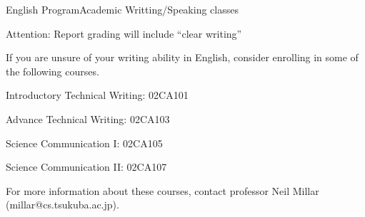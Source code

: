 \documentclass[t]{beamer}
\begin{document}
\begin{ftst}
{English Program}{Academic Writting/Speaking classes}
\begin{block}{}
Attention: Report grading will include ``clear writing''
\end{block}

\vone

If you are unsure of your writing ability in English, 
consider enrolling in some of the following courses.

\vone

\bitems Introductory Technical Writing: 02CA101
\item Advance Technical Writing: 02CA103
\item Science Communication I: 02CA105
\item Science Communication II: 02CA107
\eitem

\vone

For more information about these courses, contact professor
Neil Millar (millar@cs.tsukuba.ac.jp).
\end{ftst}
\end{document}
